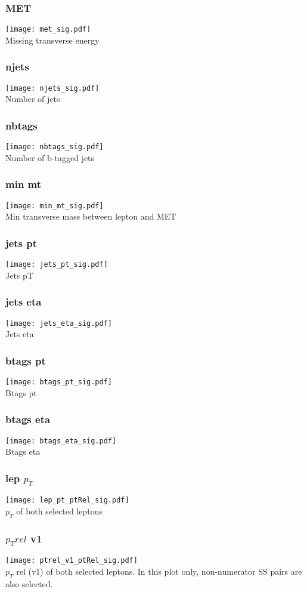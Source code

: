 \documentclass{beamer}
\begin{document}
\begin{frame}
\frametitle{MET}
\texttt{[image: met\_sig.pdf]} \\
Missing transverse energy
\end{frame}

\begin{frame}
\frametitle{njets}
\texttt{[image: njets\_sig.pdf]} \\
Number of jets
\end{frame}

\begin{frame}
\frametitle{nbtags}
\texttt{[image: nbtags\_sig.pdf]} \\
Number of b-tagged jets
\end{frame}

\begin{frame}
\frametitle{min mt}
\texttt{[image: min\_mt\_sig.pdf]} \\
Min transverse mass between lepton and MET
\end{frame}

\begin{frame}
\frametitle{jets pt}
\texttt{[image: jets\_pt\_sig.pdf]} \\
Jets pT
\end{frame}

\begin{frame}
\frametitle{jets eta}
\texttt{[image: jets\_eta\_sig.pdf]} \\
Jets eta
\end{frame}

\begin{frame}
\frametitle{btags pt}
\texttt{[image: btags\_pt\_sig.pdf]} \\
Btags pt
\end{frame}

\begin{frame}
\frametitle{btags eta}
\texttt{[image: btags\_eta\_sig.pdf]} \\
Btags eta
\end{frame}

\begin{frame}
\frametitle{lep $p_T$}
\texttt{[image: lep\_pt\_ptRel\_sig.pdf]} \\
$p_T$ of both selected leptons
\end{frame}

\begin{frame}
\frametitle{$p_T rel$ v1}
\texttt{[image: ptrel\_v1\_ptRel\_sig.pdf]} \\
$p_T$ rel (v1) of both selected leptons.  In this plot only, non-numerator SS pairs are also selected.  
\end{frame}
\end{document}
